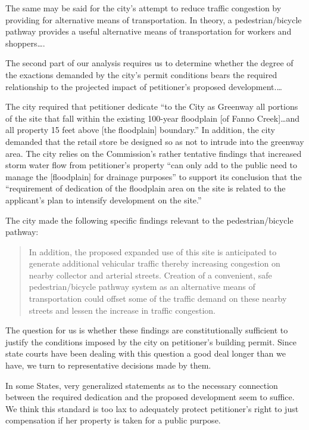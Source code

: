 The same may be said for the city's attempt to reduce traffic congestion by
providing for alternative means of transportation. In theory, a
pedestrian/bicycle pathway provides a useful alternative means of transportation
for workers and shoppers\ldots.



The second part of our analysis requires us to determine whether the degree of
the exactions demanded by the city's permit conditions bears the required
relationship to the projected impact of petitioner's proposed development.\ldots

The city required that petitioner dedicate ``to the City as Greenway all
portions of the site that fall within the existing 100-year floodplain [of Fanno
Creek]\ldots and all property 15 feet above [the floodplain] boundary.'' In
addition, the city demanded that the retail store be designed so as not to
intrude into the greenway area. The city relies on the Commission's rather
tentative findings that increased storm water flow from petitioner's property
``can only add to the public need to manage the [floodplain] for drainage
purposes'' to support its conclusion that the ``requirement of dedication of the
floodplain area on the site is related to the applicant's plan to intensify
development on the site.'' 

The city made the following specific findings relevant to the pedestrian/bicycle
pathway:
\begin{quote}
In addition, the proposed expanded use of this site is anticipated to generate
additional vehicular traffic thereby increasing congestion on nearby collector
and arterial streets. Creation of a convenient, safe pedestrian/bicycle pathway
system as an alternative means of transportation could offset some of the
traffic demand on these nearby streets and lessen the increase in traffic
congestion.
\end{quote}

The question for us is whether these findings are constitutionally sufficient to
justify the conditions imposed by the city on petitioner's building permit.
Since state courts have been dealing with this question a good deal longer than
we have, we turn to representative decisions made by them.

In some States, very generalized statements as to the necessary connection
between the required dedication and the proposed development seem to suffice. We
think this standard is too lax to adequately protect petitioner's right to just
compensation if her property is taken for a public purpose.

